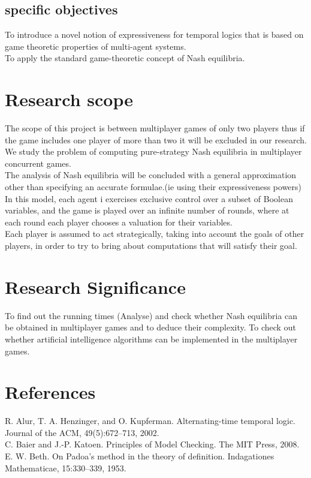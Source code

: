 \documentclass[14pt, a4paper]{article}
\begin{document}
				
				\subsection{specific objectives}
						To introduce a novel notion of expressiveness for temporal logics that is based on game theoretic properties of multi-agent systems.\\
		To apply the standard game-theoretic concept of Nash equilibria.\\

			
			\section{Research scope}
			
				The scope of this project is between multiplayer games of only two players thus if the game includes one player of more than two it will be excluded in our research.\\
	We study the problem of computing pure-strategy Nash equilibria in multiplayer concurrent games.\\
	The analysis of Nash equilibria will be concluded with a general approximation other than specifying an accurate formulae.(ie using their expressiveness powers)\\

	In this model, each agent i exercises exclusive control over a subset of Boolean variables, and the game is played over an infinite number of rounds, where at each round each player chooses a valuation for their variables.\\

	Each player is assumed to act strategically, taking into account the goals of other players,
in order to try to bring about computations that will satisfy their goal.\\

			
			\section{Research Significance}
			
				To find out the running times (Analyse) and check whether Nash equilibria can be obtained in multiplayer games and to deduce their complexity.
				To check out whether artificial intelligence algorithms can be implemented in the multiplayer 
games.

			
			\section{References}
R. Alur, T. A. Henzinger, and O. Kupferman. Alternating-time
temporal logic. Journal of the ACM, 49(5):672–713, 2002.\\
C. Baier and J.-P. Katoen. Principles of Model Checking. The
MIT Press, 2008.\\
E. W. Beth. On Padoa’s method in the theory of definition.
Indagationes Mathematicae, 15:330–339, 1953.\\

				
	

	
\end{document}
